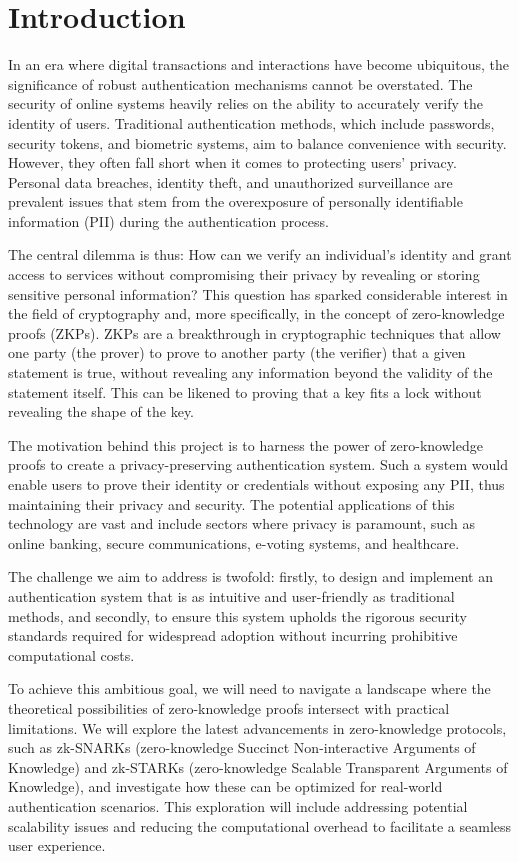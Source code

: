 \section{Introduction}
\label{sec:intro}

In an era where digital transactions and interactions have become ubiquitous, the significance of robust authentication mechanisms cannot be overstated. The security of online systems heavily relies on the ability to accurately verify the identity of users. Traditional authentication methods, which include passwords, security tokens, and biometric systems, aim to balance convenience with security. However, they often fall short when it comes to protecting users' privacy. Personal data breaches, identity theft, and unauthorized surveillance are prevalent issues that stem from the overexposure of personally identifiable information (PII) during the authentication process.

The central dilemma is thus: How can we verify an individual's identity and grant access to services without compromising their privacy by revealing or storing sensitive personal information? This question has sparked considerable interest in the field of cryptography and, more specifically, in the concept of zero-knowledge proofs (ZKPs). ZKPs are a breakthrough in cryptographic techniques that allow one party (the prover) to prove to another party (the verifier) that a given statement is true, without revealing any information beyond the validity of the statement itself. This can be likened to proving that a key fits a lock without revealing the shape of the key.

The motivation behind this project is to harness the power of zero-knowledge proofs to create a privacy-preserving authentication system. Such a system would enable users to prove their identity or credentials without exposing any PII, thus maintaining their privacy and security. The potential applications of this technology are vast and include sectors where privacy is paramount, such as online banking, secure communications, e-voting systems, and healthcare.

The challenge we aim to address is twofold: firstly, to design and implement an authentication system that is as intuitive and user-friendly as traditional methods, and secondly, to ensure this system upholds the rigorous security standards required for widespread adoption without incurring prohibitive computational costs.

To achieve this ambitious goal, we will need to navigate a landscape where the theoretical possibilities of zero-knowledge proofs intersect with practical limitations. We will explore the latest advancements in zero-knowledge protocols, such as zk-SNARKs (zero-knowledge Succinct Non-interactive Arguments of Knowledge) and zk-STARKs (zero-knowledge Scalable Transparent Arguments of Knowledge), and investigate how these can be optimized for real-world authentication scenarios. This exploration will include addressing potential scalability issues and reducing the computational overhead to facilitate a seamless user experience.

